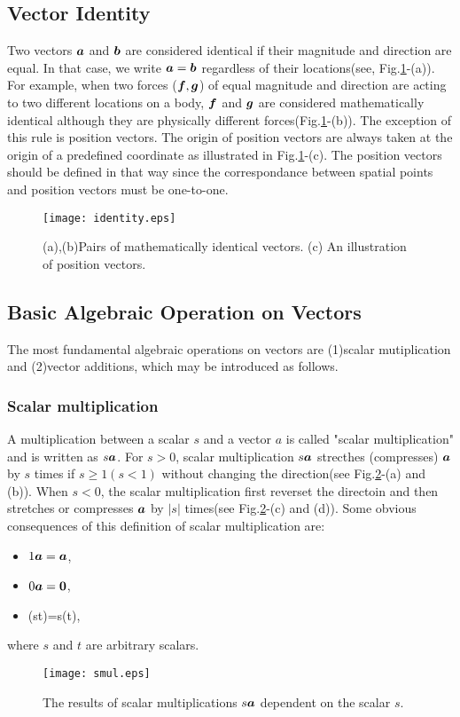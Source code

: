 \documentclass[10pt,a4j]{article}
\begin{document}
\subsection{Vector Identity}
Two vectors $\mbox{\boldmath $a$}$ and $\mbox{\boldmath $b$}$ are considered identical 
if their magnitude and direction are equal.
In that case, we write $\mbox{\boldmath $a$}=\mbox{\boldmath $b$}$ regardless of their locations(see, Fig.\ref{fig:fig1_2}-(a)). 
For example, when two forces ($\mbox{\boldmath $f$}, \mbox{\boldmath $g$}$) of equal magnitude and direction 
are acting to two different locations on a body, 
$\mbox{\boldmath $f$}$ and $\mbox{\boldmath $g$}$ are considered mathematically identical although they 
are physically different forces(Fig.\ref{fig:fig1_2}-(b)).
The exception of this rule is position vectors. 
The origin of position vectors are always taken at 
the origin of a predefined coordinate as illustrated in Fig.\ref{fig:fig1_2}-(c).
The position vectors should be defined in that way since the correspondance between 
spatial points and position vectors must be one-to-one. 
\begin{figure}[h]
	\begin{center}
	\texttt{[image: identity.eps]} 
	\end{center}
	\caption{(a),(b)Pairs of mathematically identical vectors. 
	(c) An illustration of position vectors.} 
	\label{fig:fig1_2}
\end{figure}
\subsection{Basic Algebraic Operation on Vectors}
The most fundamental algebraic operations on vectors are (1)scalar mutiplication 
and (2)vector additions, which may be introduced as follows.
\subsubsection{Scalar multiplication}
A multiplication between a scalar $s$ and a vector $a$ is called "scalar multiplication" 
and is written as $s\mbox{\boldmath $a$}$. For $s>0$, scalar multiplication $s\mbox{\boldmath $a$}$ strecthes (compresses) $\mbox{\boldmath $a$}$ 
by $s$ times if $s \geq 1 (s<1)$ without changing the direction(see Fig.\ref{fig:fig1_3}-(a) and (b)).
When $s<0$, the scalar multiplication first reverset the directoin and then stretches or compresses 
$\mbox{\boldmath $a$}$ by $|s|$ times(see Fig.\ref{fig:fig1_3}-(c) and (d)).
Some obvious consequences of this definition of scalar multiplication are:
\begin{itemize}
\item 
	$1\mbox{\boldmath $a$}=\mbox{\boldmath $a$}$,
\item 
	$0\mbox{\boldmath $a$}=\mbox{\boldmath $0$}$,
\item
	(st)=s(t),
\end{itemize}
where $s$ and $t$ are arbitrary scalars. 
\begin{figure}[h]
	\begin{center}
	\texttt{[image: smul.eps]} 
	\end{center}
	\caption{The results of scalar multiplications $s\mbox{\boldmath $a$}$ dependent on the scalar $s$.} 
	\label{fig:fig1_3}
\end{figure}
\end{document}
